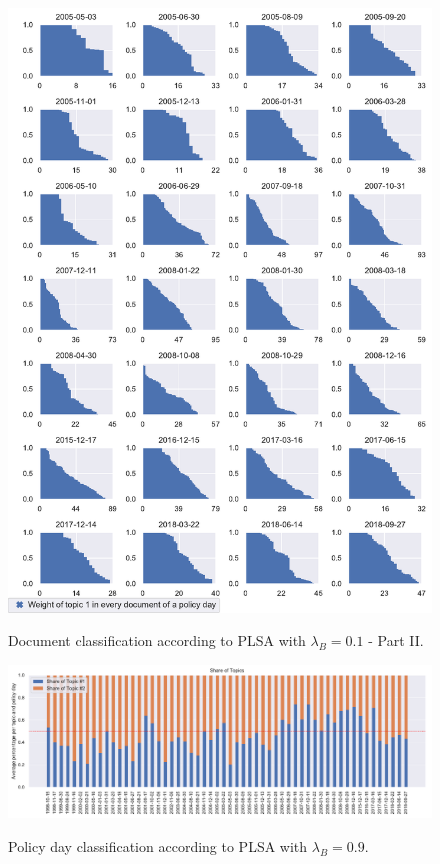 \documentclass[11pt,a4paper,english,oneside]{book}
\numberwithin{equation}{chapter}
\begin{document}
\begin{figure}
	\caption{Document classification according to PLSA with $\lambda_B = 0.1$ - Part II.}
	\centering
	\includegraphics[scale=0.8]{Images/docsplit02_bgLamb_0_1.pdf}
	\label{classdoc02L01}
\end{figure}

\begin{figure}
	\caption{Policy day classification according to PLSA with $\lambda_B = 0.9$.}
	\centering
	\includegraphics[scale=0.8]{Images/plsamodelling_bgLamb_0_9.pdf}
	\label{classPLSAL09}
\end{figure}
\end{document}
